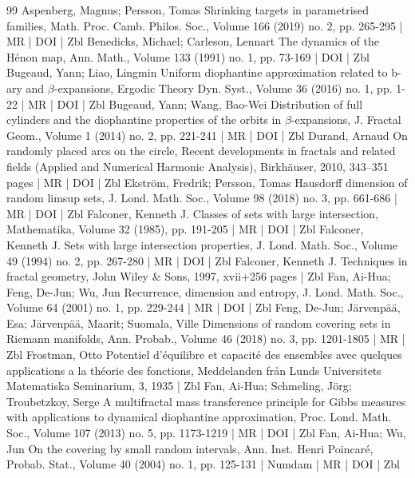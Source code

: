 \begin{thebibliography}{99}
Aspenberg, Magnus; Persson, Tomas Shrinking targets in parametrised families, Math. Proc. Camb. Philos. Soc., Volume 166 (2019) no. 2, pp. 265-295 | MR | DOI | Zbl
Benedicks, Michael; Carleson, Lennart The dynamics of the Hénon map, Ann. Math., Volume 133 (1991) no. 1, pp. 73-169 | DOI | Zbl
Bugeaud, Yann; Liao, Lingmin Uniform diophantine approximation related to b-ary and \ensuremath{\beta}-expansions, Ergodic Theory Dyn. Syst., Volume 36 (2016) no. 1, pp. 1-22 | MR | DOI | Zbl
Bugeaud, Yann; Wang, Bao-Wei Distribution of full cylinders and the diophantine properties of the orbits in \ensuremath{\beta}-expansions, J. Fractal Geom., Volume 1 (2014) no. 2, pp. 221-241 | MR | DOI | Zbl
Durand, Arnaud On randomly placed arcs on the circle, Recent developments in fractals and related fields (Applied and Numerical Harmonic Analysis), Birkhäuser, 2010, 343–351 pages | MR | DOI | Zbl
Ekström, Fredrik; Persson, Tomas Hausdorff dimension of random limsup sets, J. Lond. Math. Soc., Volume 98 (2018) no. 3, pp. 661-686 | MR | DOI | Zbl
Falconer, Kenneth J. Classes of sets with large intersection, Mathematika, Volume 32 (1985), pp. 191-205 | MR | DOI | Zbl
Falconer, Kenneth J. Sets with large intersection properties, J. Lond. Math. Soc., Volume 49 (1994) no. 2, pp. 267-280 | MR | DOI | Zbl
Falconer, Kenneth J. Techniques in fractal geometry, John Wiley \& Sons, 1997, xvii+256 pages | Zbl
Fan, Ai-Hua; Feng, De-Jun; Wu, Jun Recurrence, dimension and entropy, J. Lond. Math. Soc., Volume 64 (2001) no. 1, pp. 229-244 | MR | DOI | Zbl
Feng, De-Jun; Järvenpää, Esa; Järvenpää, Maarit; Suomala, Ville Dimensions of random covering sets in Riemann manifolds, Ann. Probab., Volume 46 (2018) no. 3, pp. 1201-1805 | MR | Zbl
Frostman, Otto Potentiel d’équilibre et capacité des ensembles avec quelques applications a la théorie des fonctions, Meddelanden från Lunds Universitets Matematiska Seminarium, 3, 1935 | Zbl
Fan, Ai-Hua; Schmeling, Jörg; Troubetzkoy, Serge A multifractal mass transference principle for Gibbs measures with applications to dynamical diophantine approximation, Proc. Lond. Math. Soc., Volume 107 (2013) no. 5, pp. 1173-1219 | MR | DOI | Zbl
Fan, Ai-Hua; Wu, Jun On the covering by small random intervals, Ann. Inst. Henri Poincaré, Probab. Stat., Volume 40 (2004) no. 1, pp. 125-131 | Numdam | MR | DOI | Zbl

\end{thebibliography}
